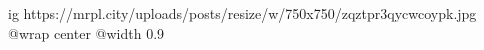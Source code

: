  
 
 
 
 

\ifcmt
  ig https://mrpl.city/uploads/posts/resize/w/750x750/zqztpr3qycwcoypk.jpg
  @wrap center
  @width 0.9
\fi
